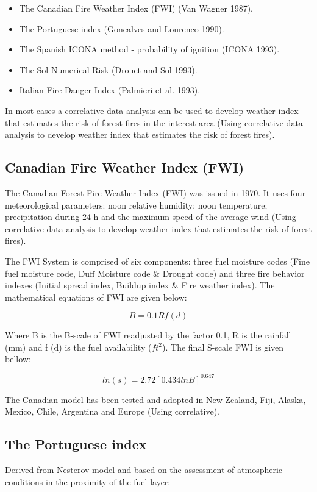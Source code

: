 {{	\begin{itemize}
		\item The Canadian Fire Weather Index (FWI) (Van Wagner 1987).
		\item The Portuguese index (Goncalves and Lourenco 1990).
		\item The Spanish ICONA method - probability of ignition (ICONA 1993).
		\item The Sol Numerical Risk (Drouet and Sol 1993).
		\item Italian Fire Danger Index (Palmieri et al. 1993).
	\end{itemize}

	In most cases a correlative data analysis can be used to develop weather index that estimates the risk of forest fires in the interest area (Using correlative data analysis to develop weather index that estimates the risk of forest fires).

\subsection{Canadian Fire Weather Index (FWI)}
	The Canadian Forest Fire Weather Index (FWI) was issued in 1970. It uses four meteorological parameters: noon relative humidity; noon temperature; precipitation during 24 h and the maximum speed of the average wind (Using correlative data analysis to develop weather index that estimates the risk of forest fires).
	
	The FWI System is comprised of six components: three fuel moisture codes (Fine fuel moisture code, Duff Moisture code \& Drought code) and three fire behavior indexes (Initial spread index, Buildup index \& Fire weather index). The mathematical equations of FWI are given below:
	
	\begin{equation}
	B=0.1Rf(d)
	\end{equation}
	
	Where B is the B-scale of FWI readjusted by the factor 0.1, R is the rainfall (mm) and f (d) is the fuel availability ($ft^2$). The final
	S-scale FWI is given bellow:

	\begin{equation}
	ln(s)=2.72[0.434lnB]^{0.647}
	\end{equation}
	
	The Canadian model has been tested and adopted in New Zealand, Fiji, Alaska, Mexico, Chile, Argentina and Europe (Using correlative).
	
	\subsection{The Portuguese index}
		Derived from Nesterov model and based on the assessment of atmospheric conditions in the proximity of the fuel layer:
		
}}
